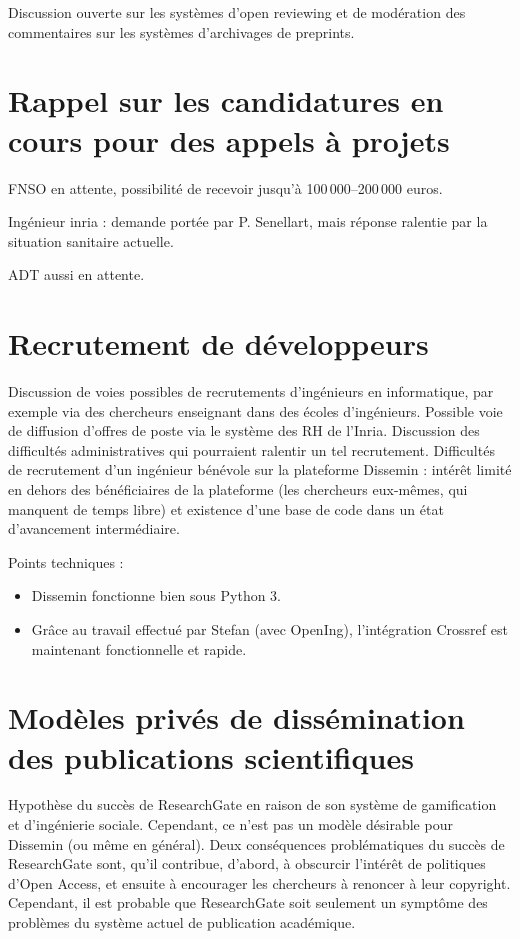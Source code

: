 \documentclass[a4paper]{article}
\begin{document}
Discussion ouverte sur les systèmes d'open reviewing et de modération des commentaires sur les systèmes d'archivages de preprints. 

\section{Rappel sur les candidatures en cours pour des appels à projets}
FNSO en attente, possibilité de recevoir jusqu'à 100\,000--200\,000 euros. 

Ingénieur inria : demande portée par P. Senellart, mais réponse ralentie par la situation sanitaire actuelle.

ADT aussi en attente. 

\section{Recrutement de développeurs}
Discussion de voies possibles de recrutements d'ingénieurs en informatique, par exemple via des chercheurs enseignant dans des écoles d'ingénieurs. Possible voie de diffusion d'offres de poste via le système des RH de l'Inria. Discussion des difficultés administratives qui pourraient ralentir un tel recrutement. Difficultés de recrutement d'un ingénieur bénévole sur la plateforme Dissemin : intérêt limité en dehors des bénéficiaires de la plateforme (les chercheurs eux-mêmes, qui manquent de temps libre) et existence d'une base de code dans un état d'avancement intermédiaire.


Points techniques : \begin{itemize}
\item Dissemin fonctionne bien sous Python 3. 
\item Grâce au travail effectué par Stefan (avec OpenIng), l'intégration Crossref est maintenant fonctionnelle et rapide. 
\end{itemize}

\section{Modèles privés de dissémination des publications scientifiques}

Hypothèse du succès de ResearchGate en raison de son système de gamification et d'ingénierie sociale. Cependant, ce n'est pas un modèle désirable pour Dissemin (ou même en général). Deux conséquences problématiques du succès de ResearchGate sont, qu'il contribue, d'abord, à obscurcir l'intérêt de politiques d'Open Access, et ensuite à encourager les chercheurs à renoncer à leur copyright. Cependant, il est probable que ResearchGate soit seulement un symptôme des problèmes du système actuel de publication académique.
\end{document}
